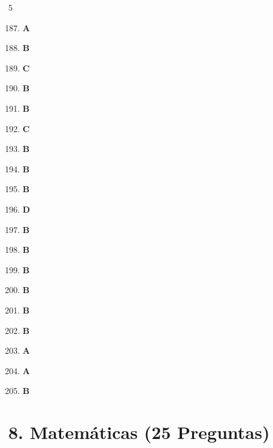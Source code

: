 \documentclass[10pt,a4paper]{article}
\begin{document}
\begin{tcolorbox}[colback=gray!5!white,colframe=gray!60!black,title=\textbf{CLAVE DE RESPUESTAS -- LEGISLACIÓN SALVADOREÑA}]
\begin{multicols}{5}
\begin{enumerate}[label=\textbf{\arabic*.}]
\setcounter{enumi}{186}
  \item \textbf{A}
  \item \textbf{B}
  \item \textbf{C}
  \item \textbf{B}
  \item \textbf{B}
  \item \textbf{C}
  \item \textbf{B}
  \item \textbf{B}
  \item \textbf{B}
  \item \textbf{D}
  \item \textbf{B}
  \item \textbf{B}
  \item \textbf{B}
  \item \textbf{B}
  \item \textbf{B}
  \item \textbf{B}
  \item \textbf{A}
  \item \textbf{A}
  \item \textbf{B}
\end{enumerate}
\end{multicols}
\end{tcolorbox}
\newpage\n
\section{8. Matemáticas (25 Preguntas)}
\end{document}
